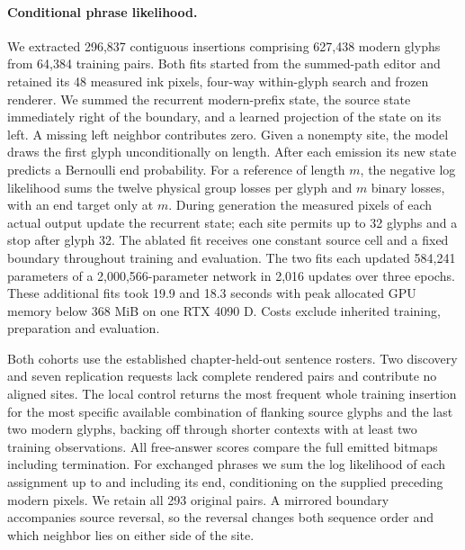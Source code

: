 \paragraph{Conditional phrase likelihood.}
We extracted 296,837 contiguous insertions comprising 627,438 modern glyphs from 64,384 training pairs. Both fits started from the summed-path editor and retained its 48 measured ink pixels, four-way within-glyph search and frozen renderer. We summed the recurrent modern-prefix state, the source state immediately right of the boundary, and a learned projection of the state on its left. A missing left neighbor contributes zero. Given a nonempty site, the model draws the first glyph unconditionally on length. After each emission its new state predicts a Bernoulli end probability. For a reference of length $m$, the negative log likelihood sums the twelve physical group losses per glyph and $m$ binary losses, with an end target only at $m$. During generation the measured pixels of each actual output update the recurrent state; each site permits up to 32 glyphs and a stop after glyph 32. The ablated fit receives one constant source cell and a fixed boundary throughout training and evaluation. The two fits each updated 584,241 parameters of a 2,000,566-parameter network in 2,016 updates over three epochs. These additional fits took 19.9 and 18.3 seconds with peak allocated GPU memory below 368 MiB on one RTX 4090 D. Costs exclude inherited training, preparation and evaluation.

Both cohorts use the established chapter-held-out sentence rosters. Two discovery and seven replication requests lack complete rendered pairs and contribute no aligned sites. The local control returns the most frequent whole training insertion for the most specific available combination of flanking source glyphs and the last two modern glyphs, backing off through shorter contexts with at least two training observations. All free-answer scores compare the full emitted bitmaps including termination. For exchanged phrases we sum the log likelihood of each assignment up to and including its end, conditioning on the supplied preceding modern pixels. We retain all 293 original pairs. A mirrored boundary accompanies source reversal, so the reversal changes both sequence order and which neighbor lies on either side of the site.
